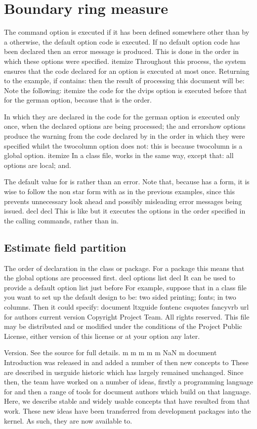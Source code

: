 \documentclass{article}
\begin{document}
\section{Boundary ring measure}\label{sec8}
The command option is executed if it has been defined somewhere other than by a otherwise, the default option code is executed. If no default option code has been declared then an error message is produced. This is done in the order in which these options were specified. itemize Throughout this process, the system ensures that the code declared for an option is executed at most once. Returning to the example, if contains: then the result of processing this document will be: Note the following: itemize the code for the dvips option is executed before that for the german option, because that is the order.

In which they are declared in the code for the german option is executed only once, when the declared options are being processed; the and errorshow options produce the warning from the code declared by in the order in which they were specified whilst the twocolumn option does not: this is because twocolumn is a global option. itemize In a class file, works in the same way, except that: all options are local; and.

The default value for is rather than an error. Note that, because has a form, it is wise to follow the non star form with as in the previous examples, since this prevents unnecessary look ahead and possibly misleading error messages being issued. decl decl This is like but it executes the options in the order specified in the calling commands, rather than in.

\subsection{Estimate field partition}
The order of declaration in the class or package. For a package this means that the global options are processed first. decl options list decl It can be used to provide a default option list just before For example, suppose that in a class file you want to set up the default design to be: two sided printing; fonts; in two columns. Then it could specify: document ltxguide fontenc csquotes fancyvrb url for authors current version Copyright Project Team. All rights reserved. This file may be distributed and or modified under the conditions of the Project Public License, either version of this license or at your option any later.

Version. See the source for full details. m m m m m NaN m document Introduction was released in and added a number of then new concepts to These are described in usrguide historic which has largely remained unchanged. Since then, the team have worked on a number of ideas, firstly a programming language for and then a range of tools for document authors which build on that language. Here, we describe stable and widely usable concepts that have resulted from that work. These new ideas have been transferred from development packages into the kernel. As such, they are now available to.
\end{document}
